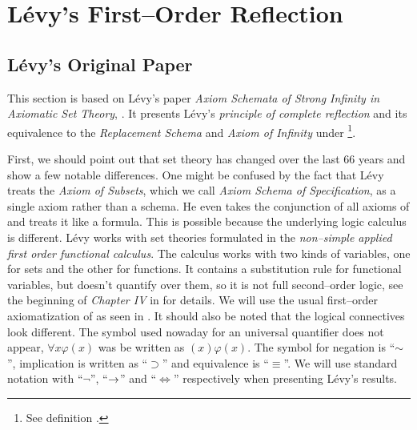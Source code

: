 \section{Lévy's First–Order Reflection}\label{sec:first_order}

\subsection{Lévy's Original Paper}\label{sec:levy1960}
This section is based on Lévy's paper \emph{Axiom Schemata of Strong Infinity in Axiomatic Set Theory}, \cite{Levy60a}. It presents Lévy's \emph{principle of complete reflection}%
 and its equivalence to the \emph{Replacement Schema} and \emph{Axiom of Infinity} under \footnote{See definition .}.

First, we should point out that set theory has changed over the last 66 years and show a few notable differences.
One might be confused by the fact that Lévy treats the \emph{Axiom of Subsets}, which we call \emph{Axiom Schema of Specification}, as a single axiom rather than a schema. He even takes the conjunction of all axioms of  and treats it like a formula. This is possible because the underlying logic calculus is different. Lévy works with set theories formulated in the \emph{non–simple applied first order functional calculus}. The calculus works with two kinds of variables, one for sets and the other for functions. It contains a substitution rule for functional variables, but doesn't quantify over them, so it is not full second–order logic, see the beginning of \emph{Chapter IV} in \cite{church1996introduction} for details.%
We will use the usual first–order axiomatization of  as seen in \cite{JechBook}.
It should also be noted that the logical connectives look different. The symbol used nowaday for an universal quantifier does not appear, $\forall x \varphi (x)$ was be written as $(x) \varphi (x)$.
The symbol for negation is ``$\sim$'', implication is written as ``$\supset$'' and equivalence is ``$\equiv$''. We will use standard notation with ``$\neg$'', ``$\rightarrow$'' and ``$\iff$'' respectively when presenting Lévy's results.

